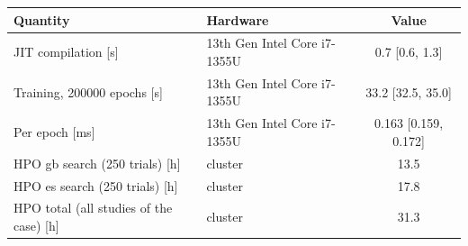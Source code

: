\begin{tabular}{llc}
\toprule
Quantity & Hardware & Value \\
\midrule
JIT compilation [s] & 13th Gen Intel Core i7-1355U & \num{0.7} [\num{0.6}, \num{1.3}] \\
Training, \num{200000} epochs [s] & 13th Gen Intel Core i7-1355U & \num{33.2} [\num{32.5}, \num{35.0}] \\
Per epoch [ms] & 13th Gen Intel Core i7-1355U & \num{0.163} [\num{0.159}, \num{0.172}] \\
HPO gb search (250 trials) [h] & cluster & \num{13.5} \\
HPO es search (250 trials) [h] & cluster & \num{17.8} \\
HPO total (all studies of the case) [h] & cluster & \num{31.3} \\
\bottomrule
\end{tabular}
